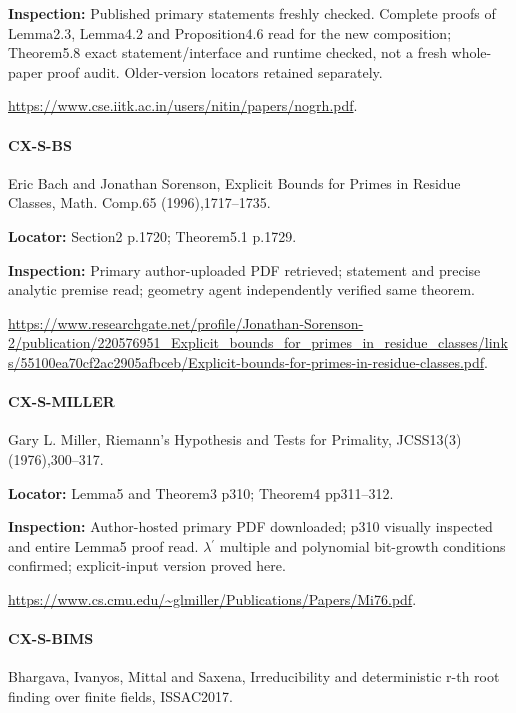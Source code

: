 \documentclass[11pt,a4paper]{article}
\begin{document}
\textbf{Inspection:} Published primary statements freshly checked.\allowbreak{} Complete proofs of Lemma2.\allowbreak{}3, Lemma4.\allowbreak{}2 and Proposition4.\allowbreak{}6 read for the new composition; Theorem5.\allowbreak{}8 exact statement/\allowbreak{}interface and runtime checked, not a fresh whole-paper proof audit.\allowbreak{} Older-version locators retained separately.\allowbreak{}

\url{https://www.cse.iitk.ac.in/users/nitin/papers/nogrh.pdf}.

\paragraph{CX-S-BS} Eric Bach and Jonathan Sorenson, Explicit Bounds for Primes in Residue Classes, Math.\allowbreak{} Comp.\allowbreak{}65 (1996),1717–\allowbreak{}1735.

\textbf{Locator:} Section2 p.\allowbreak{}1720; Theorem5.\allowbreak{}1 p.\allowbreak{}1729.

\textbf{Inspection:} Primary author-uploaded PDF retrieved; statement and precise analytic premise read; geometry agent independently verified same theorem.\allowbreak{}

\url{https://www.researchgate.net/profile/Jonathan-Sorenson-2/publication/220576951_Explicit_bounds_for_primes_in_residue_classes/links/55100ea70cf2ac2905afbceb/Explicit-bounds-for-primes-in-residue-classes.pdf}.

\paragraph{CX-S-MILLER} Gary L.\allowbreak{} Miller, Riemann’s Hypothesis and Tests for Primality, JCSS13(3) (1976),300–\allowbreak{}317.

\textbf{Locator:} Lemma5 and Theorem3 p310; Theorem4 pp311–\allowbreak{}312.

\textbf{Inspection:} Author-hosted primary PDF downloaded; p310 visually inspected and entire Lemma5 proof read.\allowbreak{} \ensuremath{\lambda}\ensuremath{{}^{\prime}} multiple and polynomial bit-growth conditions confirmed; explicit-input version proved here.\allowbreak{}

\url{https://www.cs.cmu.edu/~glmiller/Publications/Papers/Mi76.pdf}.

\paragraph{CX-S-BIMS} Bhargava, Ivanyos, Mittal and Saxena, Irreducibility and deterministic r-th root finding over finite fields, ISSAC2017.
\end{document}
